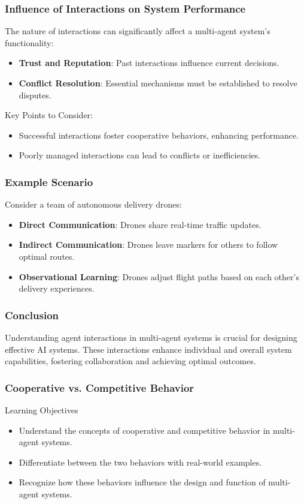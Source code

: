 \documentclass[aspectratio=169]{beamer}
\begin{document}
\begin{frame}[fragile]
    \frametitle{Influence of Interactions on System Performance}
    The nature of interactions can significantly affect a multi-agent system's functionality:
    \begin{itemize}
        \item \textbf{Trust and Reputation}: Past interactions influence current decisions.
        \item \textbf{Conflict Resolution}: Essential mechanisms must be established to resolve disputes.
    \end{itemize}
    
    Key Points to Consider:
    \begin{itemize}
        \item Successful interactions foster cooperative behaviors, enhancing performance.
        \item Poorly managed interactions can lead to conflicts or inefficiencies.
    \end{itemize}
\end{frame}

\begin{frame}[fragile]
    \frametitle{Example Scenario}
    Consider a team of autonomous delivery drones:
    \begin{itemize}
        \item \textbf{Direct Communication}: Drones share real-time traffic updates.
        \item \textbf{Indirect Communication}: Drones leave markers for others to follow optimal routes.
        \item \textbf{Observational Learning}: Drones adjust flight paths based on each other's delivery experiences.
    \end{itemize}
\end{frame}

\begin{frame}[fragile]
    \frametitle{Conclusion}
    Understanding agent interactions in multi-agent systems is crucial for designing effective AI systems. 
    These interactions enhance individual and overall system capabilities, fostering collaboration and achieving optimal outcomes.
\end{frame}

\begin{frame}[fragile]
    \frametitle{Cooperative vs. Competitive Behavior}
    \begin{block}{Learning Objectives}
        \begin{itemize}
            \item Understand the concepts of cooperative and competitive behavior in multi-agent systems.
            \item Differentiate between the two behaviors with real-world examples.
            \item Recognize how these behaviors influence the design and function of multi-agent systems.
        \end{itemize}
    \end{block}
\end{frame}
\end{document}
